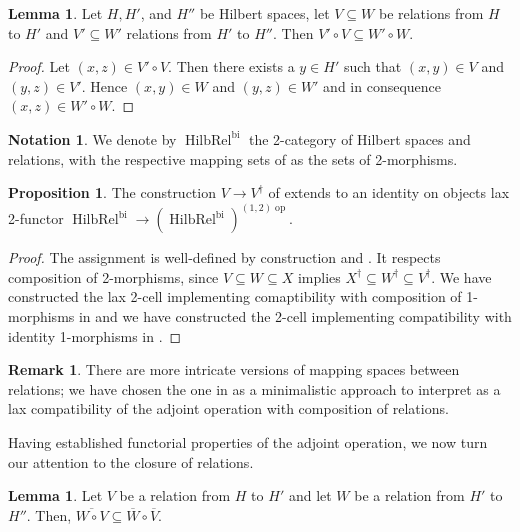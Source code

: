 \documentclass{article}
\newcommand{\opp}{\operatorname{op}}%
\newcommand{\HilbRel}{\operatorname{HilbRel}}%
\numberwithin{equation}{section}
\theoremstyle{definition}
\newtheorem{lemma}[definition]{Lemma}
\newtheorem{proposition}[definition]{Proposition}
\newtheorem{remark}[definition]{Remark}
\newtheorem{notation}[definition]{Notation}
\theoremstyle{theorem}
\begin{document}
\begin{lemma}
    Let $H,H'$, and $H''$ be Hilbert spaces, let $V \subseteq W$ be relations from $H$ to $H'$ and $V' \subseteq W'$ relations from $H'$ to $H''$. Then 
    $V' \circ V \subseteq W' \circ W$.
\end{lemma}
\begin{proof}
    Let $(x,z) \in V' \circ V$. Then there exists a $y \in H'$ such that $(x,y) \in V$ and $(y,z) \in V'$. Hence $(x,y) \in W$ and $(y,z) \in W'$ and 
    in consequence $(x,z) \in W' \circ W$.
\end{proof}
\begin{notation}
    We denote by $\HilbRel^{\text{bi}}$ the 2-category of Hilbert spaces and relations, with the respective mapping sets of 
     as the sets of 2-morphisms. 
\end{notation}
\begin{proposition}
    The construction $V \to V^\dagger$ of  extends to an identity on objects 
    lax 2-functor $\HilbRel^{\text{bi}} \to (\HilbRel^{\text{bi}})^{(1,2)\opp}$.
\end{proposition}
\begin{proof}
    The assignment is well-defined by construction and . It respects composition 
    of 2-morphisms, since $V \subseteq W \subseteq X$ implies $X^\dagger \subseteq W^\dagger \subseteq V^\dagger$. We have 
    constructed the lax 2-cell implementing comaptibility with composition of 1-morphisms in  and 
    we have constructed the 2-cell implementing compatibility with identity 1-morphisms in .
\end{proof}
\begin{remark}
    There are more intricate versions of mapping spaces between relations; we have chosen the one in  
    as a minimalistic approach to interpret  as a lax compatibility of the adjoint operation with composition of relations.
\end{remark}
Having established functorial properties of the adjoint operation, we now turn our attention to the closure of relations.
\begin{lemma}\label{Lemma: compatibility of closure and composition}
    Let $V$ be a relation from $H$ to $H'$ and let $W$ be a relation from $H'$ to $H''$. Then, $\overline{W \circ V} \subseteq \overline{W} \circ \overline{V}$.
\end{lemma}
\end{document}
